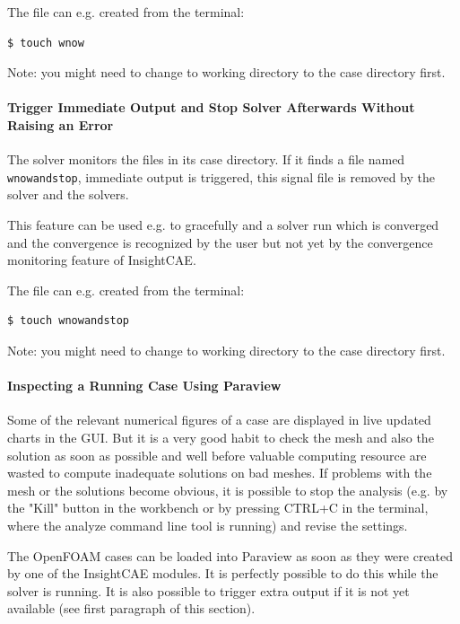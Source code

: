 The file can e.g. created from the terminal:

\begin{lstlisting}
$ touch wnow
\end{lstlisting}

Note: you might need to change to working directory to the case directory first.

\paragraph{Trigger Immediate Output and Stop Solver Afterwards Without Raising an Error}
\label{par:wnowandstop}
The solver monitors the files in its case directory.
If it finds a file named \verb!wnowandstop!, immediate output is triggered, this signal file is removed by the solver and the solvers.

This feature can be used e.g. to gracefully and a solver run which is converged and the convergence is recognized by the user but not yet by the convergence monitoring feature of InsightCAE.

The file can e.g. created from the terminal:

\begin{lstlisting}
$ touch wnowandstop
\end{lstlisting}

Note: you might need to change to working directory to the case directory first.



\paragraph{Inspecting a Running Case Using Paraview}
\label{par:isPVpy}

Some of the relevant numerical figures of a case are displayed in live updated charts in the GUI.
But it is a very good habit to check the mesh and also the solution as soon as possible and well before valuable computing resource are wasted to compute inadequate solutions on bad meshes.
If problems with the mesh or the solutions become obvious, it is possible to stop the analysis (e.g. by the "Kill" button in the workbench or by pressing CTRL+C in the terminal, where the analyze command line tool is running) and revise the settings.

The OpenFOAM cases can be loaded into Paraview as soon as they were created by one of the InsightCAE modules.
It is perfectly possible to do this while the solver is running.
It is also possible to trigger extra output if it is not yet available (see first paragraph of this section).


